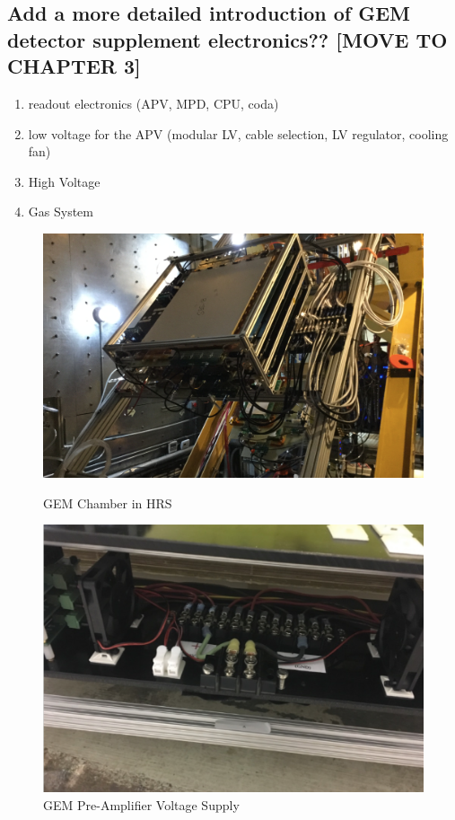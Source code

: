 \subsection{Add a more detailed introduction of GEM detector supplement electronics?? [MOVE TO CHAPTER 3]}
\begin{enumerate}
    \item readout electronics (APV, MPD, CPU, coda)
    \item low voltage for the APV (modular LV, cable selection, LV regulator, cooling fan) 
    \item High Voltage
    \item Gas System
\end{enumerate}


\begin{figure}[!htbp]
  \centering
  \begin{minipage}[b]{0.45\textwidth}
    \includegraphics[width=\textwidth]{images/chap5/gem_in_hrs.png}
    \caption{GEM Chamber in HRS}
  \end{minipage}
  \hfill
  \begin{minipage}[b]{0.45\textwidth}
    \includegraphics[width=\textwidth]{images/chap5/gem_low_voltage.png}
    \caption{GEM Pre-Amplifier Voltage Supply}
  \end{minipage}
\end{figure}


